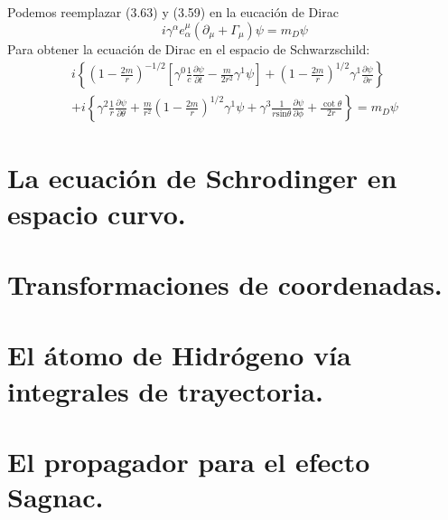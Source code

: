 Podemos reemplazar (3.63) y (3.59) en la eucación de Dirac
\begin{equation}
i\gamma^{\alpha}e_{\alpha}^{\mu}(\partial_{\mu}+\Gamma_{\mu})\psi=m_{D}\psi
\end{equation}
Para obtener la ecuación de Dirac en el espacio de Schwarzschild:
\begin{eqnarray}
\nonumber i\left\{ \left(1-\frac{2m}{r}\right)^{-1/2}\left[\gamma^{0}\frac{1}{c}\frac{\partial\psi}{\partial t}-\frac{m}{2r^{2}}\gamma^{1}\psi\right]+\left(1-\frac{2m}{r}\right)^{1/2}\gamma^{1}\frac{\partial\psi}{\partial r}\right\}\\
+i\left\{ \gamma^{2}\frac{1}{r}\frac{\partial\psi}{\partial\theta}+\frac{m}{r^{2}}\left(1-\frac{2m}{r}\right)^{1/2}\gamma^{1}\psi+\gamma^{3}\frac{1}{r\text{sin}\theta}\frac{\partial\psi}{\partial\phi}+\frac{\cot\theta}{2r}\right\} =m_{D}\psi 
\end{eqnarray}
\newpage
\section{La ecuación de Schrodinger en espacio curvo.}

\section{Transformaciones de coordenadas.}
\section{El átomo de Hidrógeno vía integrales de trayectoria.}
\section{El propagador para el efecto Sagnac.}
